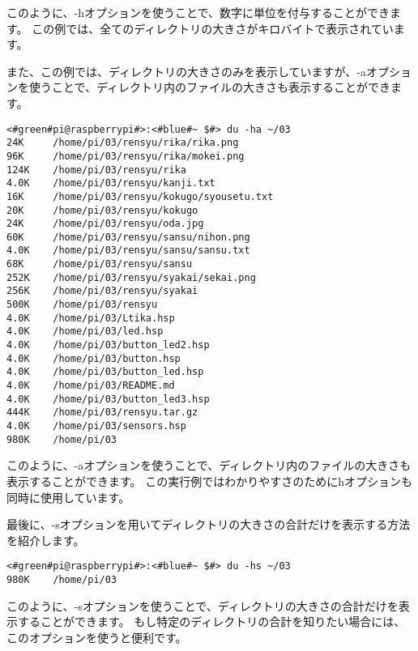 このように、-hオプションを使うことで、数字に単位を付与することができます。
この例では、全てのディレクトリの大きさがキロバイトで表示されています。

また、この例では、ディレクトリの大きさのみを表示していますが、-aオプションを使うことで、ディレクトリ内のファイルの大きさも表示することができます。

\begin{lstlisting}[caption=du -haの実行例, label=du_example]
<#green#pi@raspberrypi#>:<#blue#~ $#> du -ha ~/03
24K     /home/pi/03/rensyu/rika/rika.png
96K     /home/pi/03/rensyu/rika/mokei.png
124K	/home/pi/03/rensyu/rika
4.0K	/home/pi/03/rensyu/kanji.txt
16K     /home/pi/03/rensyu/kokugo/syousetu.txt
20K     /home/pi/03/rensyu/kokugo
24K     /home/pi/03/rensyu/oda.jpg
60K     /home/pi/03/rensyu/sansu/nihon.png
4.0K	/home/pi/03/rensyu/sansu/sansu.txt
68K     /home/pi/03/rensyu/sansu
252K	/home/pi/03/rensyu/syakai/sekai.png
256K	/home/pi/03/rensyu/syakai
500K	/home/pi/03/rensyu
4.0K	/home/pi/03/Ltika.hsp
4.0K	/home/pi/03/led.hsp
4.0K	/home/pi/03/button_led2.hsp
4.0K	/home/pi/03/button.hsp
4.0K	/home/pi/03/button_led.hsp
4.0K	/home/pi/03/README.md
4.0K	/home/pi/03/button_led3.hsp
444K	/home/pi/03/rensyu.tar.gz
4.0K	/home/pi/03/sensors.hsp
980K	/home/pi/03
\end{lstlisting}

このように、-aオプションを使うことで、ディレクトリ内のファイルの大きさも表示することができます。
この実行例ではわかりやすさのためにhオプションも同時に使用しています。

最後に、-sオプションを用いてディレクトリの大きさの合計だけを表示する方法を紹介します。

\begin{lstlisting}[caption=du -hsの実行例, label=du_example]
<#green#pi@raspberrypi#>:<#blue#~ $#> du -hs ~/03
980K	/home/pi/03
\end{lstlisting}

このように、-sオプションを使うことで、ディレクトリの大きさの合計だけを表示することができます。
もし特定のディレクトリの合計を知りたい場合には、このオプションを使うと便利です。

\begin{tcolorbox}[title=\useOmetoi]
    \begin{enumerate}
    \end{enumerate}
\end{tcolorbox}

